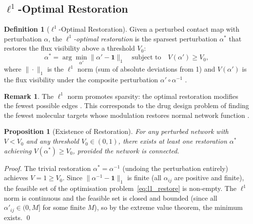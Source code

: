 \documentclass[11pt,twocolumn]{article}
\theoremstyle{plain}
\newtheorem{proposition}[theorem]{Proposition}
\theoremstyle{definition}
\newtheorem{definition}[theorem]{Definition}
\newtheorem{remark}[theorem]{Remark}
\begin{document}
\subsection{$\ell^1$-Optimal Restoration}

\begin{definition}[$\ell^1$-Optimal Restoration]
\label{def:l1_restoration}
Given a perturbed contact map with perturbation $\alpha$, the
\emph{$\ell^1$-optimal restoration} is the sparsest perturbation $\alpha^*$ that
restores the flux visibility above a threshold $V_0$:
\begin{equation}\label{eq:l1_restore}
  \alpha^* = \arg\min_{\alpha'} \|\alpha' - \mathbf{1}\|_1
  \quad\text{subject to}\quad
  V(\alpha') \geq V_0,
\end{equation}
where $\|\cdot\|_1$ is the $\ell^1$ norm (sum of absolute deviations from 1)
and $V(\alpha')$ is the flux visibility under the composite perturbation
$\alpha' \circ \alpha^{-1}$ \cite{foucart2013mathematical, candes2006robust}.
\end{definition}

\begin{remark}
The $\ell^1$ norm promotes sparsity: the optimal restoration modifies the fewest
possible edges \cite{foucart2013mathematical}. This corresponds to the drug
design problem of finding the fewest molecular targets whose modulation restores
normal network function \cite{hopkins2008network, csermely2013structure}.
\end{remark}

\begin{proposition}[Existence of Restoration]
\label{prop:restoration_exists}
For any perturbed network with $V < V_0$ and any threshold $V_0 \in (0, 1)$,
there exists at least one restoration $\alpha^*$ achieving $V(\alpha^*) \geq
V_0$, provided the network is connected.
\end{proposition}

\begin{proof}
The trivial restoration $\alpha^* = \alpha^{-1}$ (undoing the perturbation
entirely) achieves $V = 1 \geq V_0$. Since $\|\alpha^{-1} - \mathbf{1}\|_1$
is finite (all $\alpha_{ij}$ are positive and finite), the feasible set of the
optimisation problem~\eqref{eq:l1_restore} is non-empty. The $\ell^1$ norm is
continuous and the feasible set is closed and bounded (since all $\alpha'_{ij}
\in (0, M]$ for some finite $M$), so by the extreme value theorem, the minimum
exists. \qed
\end{proof}
\end{document}
